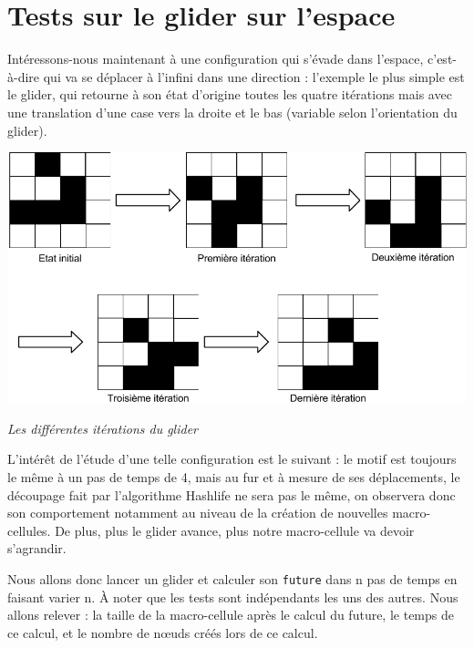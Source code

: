 \documentclass[a4paper,12pt]{report}
\begin{document}
\section{Tests sur le glider sur l'espace}

Intéressons-nous maintenant à une configuration qui s'évade dans
l'espace, c'est-à-dire qui va se déplacer à l'infini dans une
direction : l'exemple le plus simple est le glider, qui retourne à son
état d'origine toutes les quatre itérations mais avec une translation
d'une case vers la droite et le bas (variable selon l'orientation du
glider).

\medskip

\begin{center}
  \includegraphics[scale=0.4]{glider_iterations.png}  

  \textit{Les différentes itérations du glider}
\end{center}

\medskip


L'intérêt de l'étude d'une telle configuration est le suivant : le
motif est toujours le même à un pas de temps de 4, mais au fur et à
mesure de ses déplacements, le découpage fait par l'algorithme
Hashlife ne sera pas le même, on observera donc son comportement
notamment au niveau de la création de nouvelles macro-cellules. De
plus, plus le glider avance, plus notre macro-cellule va devoir
s'agrandir.

Nous allons donc lancer un glider et calculer son \texttt{future} dans n pas de
temps en faisant varier n. À noter que les tests sont indépendants les
uns des autres. Nous allons relever : la taille de la macro-cellule
après le calcul du future, le temps de ce calcul, et le nombre de
n\oe uds créés lors de ce calcul.
\end{document}
